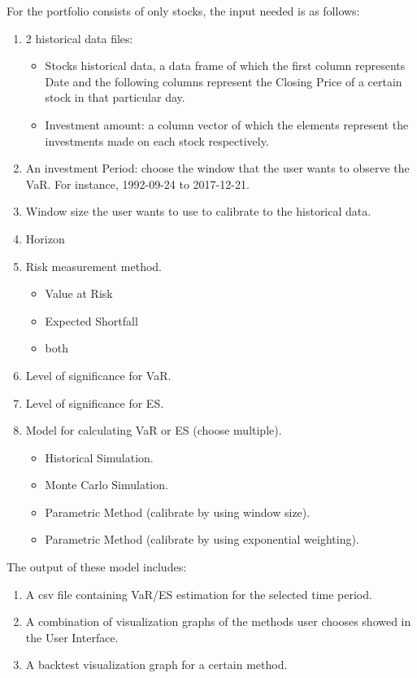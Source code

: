 \documentclass[letterpaper,11pt, oneside]{layout}
\begin{document}
For the portfolio consists of only stocks, the input needed is as follows:
\begin{enumerate}
\item 2 historical data files: 
\begin{itemize}
\item Stocks historical data, a data frame of which the first column represents Date and the following columns represent the Closing Price of a certain stock in that particular day.
\item Investment amount: a column vector of which the elements represent the investments made on each stock respectively.
\end{itemize}
\item An investment Period: choose the window that the user wants to observe the VaR. For instance, 1992-09-24 to 2017-12-21.
\item Window size the user wants to use to calibrate to the historical data.
\item Horizon
\item Risk measurement method.
	\begin{itemize}
	\item Value at Risk
	\item Expected Shortfall
	\item both
	\end{itemize}
\item Level of significance for VaR.
\item Level of significance for ES.
\item Model for calculating VaR or ES (choose multiple).
	\begin{itemize}
	\item Historical Simulation.
	\item Monte Carlo Simulation.
	\item Parametric Method (calibrate by using window size).
	\item Parametric Method (calibrate by using exponential weighting).
	\end{itemize}
\end{enumerate}

The output of these model includes:
\begin{enumerate}
\item A csv file containing VaR/ES estimation for the selected time period.
\item A combination of visualization graphs of the methods user chooses showed in the User Interface.
\item A backtest visualization graph for a certain method.
\end{enumerate}
\end{document}
